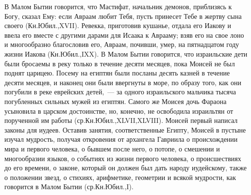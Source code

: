В Малом Бытии говорится, что Мастифат,
начальник демонов, приблизясь к Богу, сказал Ему:
если Авраам любит Тебя, пусть принесет Тебе в
жертву сына своего (Кн.Юбил.,XVII).
Ревекка, приготовив кушанье, отдала его Иакову
и ввела его вместе с другими дарами для Исаака к
Аврааму; взяв его на свое лоно и многообразно
благословив его, Авраам, почивши, умер, на
пятнадцатом году жизни Иакова (Кн.Юбил.,IXX).
В Малом Бытии говорится, что израильские дети
были бросаемы в реку только в течение десяти
месяцев, пока Моисей не был поднят царицею.
Посему на египтян были посланы десять казней в
течение десяти месяцев, и наконец они были
ввергнуты в море, по образу того, как они погубили
в реке еврейских детей,~--- за одного израильского
мальчика тысяча погубленных сильных мужей из
египтян. Самого же Моисея дочь Фараона усыновила
в царском достоинстве, но, конечно, не освободила
израильтян от порученной им работы
(ср.Кн.Юбил.,XLVII,XLVIII).
Моисей первый написал законы для иудеев.
Оставив занятия, соответственные Египту, Моисей
в пустыне изучал мудрость, получая откровения от
архангела Гавриила о происхождении мира и
первого человека, о бывшем после него, о потопе, о
смешении и многообразии языков, о событиях из
жизни первого человека, о происшествиях до его
времени, о законе, который он должен был дать
народу иудейскому, также о положении звезд, о
стихиях, арифметике, геометрии и всякой мудрости,
как говорится в Малом Бытии (ср.Кн.Юбил.,I).
